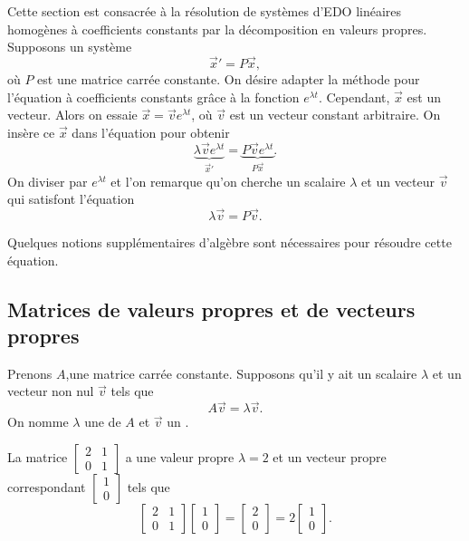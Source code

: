 Cette section est consacrée à la résolution de systèmes d’EDO linéaires homogènes à coefficients constants par la décomposition en valeurs propres. Supposons un système
\begin{equation*}
{\vec{x}}' = P\vec{x} ,
\end{equation*}
où
$P$ est une matrice carrée constante. On désire adapter la méthode pour l'équation à coefficients constants grâce à la fonction $e^{\lambda t}$.
Cependant, $\vec{x}$ est un vecteur. Alors on essaie $\vec{x} = \vec{v} e^{\lambda t}$, où
$\vec{v}$ est un vecteur constant arbitraire. On insère ce $\vec{x}$ dans l’équation pour obtenir
\begin{equation*}
\underbrace{\lambda \vec{v} e^{\lambda t}}_{{\vec{x}}'} =
\underbrace{P\vec{v} e^{\lambda t}}_{P\vec{x}} .
\end{equation*}
On diviser par $e^{\lambda t}$ et l'on remarque qu’on cherche un scalaire $\lambda$
et un vecteur $\vec{v}$ qui satisfont l’équation
\begin{equation*}
\lambda \vec{v} = P\vec{v} .
\end{equation*}

Quelques notions supplémentaires d’algèbre sont nécessaires pour résoudre cette équation.

\subsection{Matrices de valeurs propres et de vecteurs propres}

Prenons $A$,une matrice carrée constante. Supposons qu'il y ait un scalaire $\lambda$ et un vecteur non nul $\vec{v}$ tels que
\begin{equation*}
A \vec{v} = \lambda \vec{v}.
\end{equation*}
On nomme $\lambda$ une \emph{} de $A$ et $\vec{v}$
un \emph{}.

\begin{example}
La matrice $\left[ \begin{smallmatrix}
2 & 1 \\
0 & 1
\end{smallmatrix} \right]$ a une valeur propre $\lambda = 2$ et un vecteur propre correspondant $\left[ \begin{smallmatrix}
1 \\ 0
\end{smallmatrix} \right]$ tels que
\begin{equation*}
\begin{bmatrix}
2 & 1 \\
0 & 1
\end{bmatrix}
\begin{bmatrix}
1 \\ 0
\end{bmatrix}
=
\begin{bmatrix}
2 \\
0 
\end{bmatrix}
=
2
\begin{bmatrix}
1 \\ 0
\end{bmatrix} .
\end{equation*}
\end{example}

